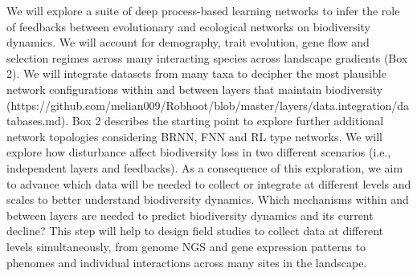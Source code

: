 \documentclass[12pt]{article}
\begin{document}
\begin{center}
\begin{mybox}
\begin{singlespace}
\begin{small}
  We will explore a suite of deep process-based learning networks to infer the role of feedbacks between evolutionary and ecological networks on biodiversity dynamics. We will account for demography, trait evolution, gene flow and selection regimes across many interacting species across landscape gradients (Box 2). We will integrate datasets from many taxa to decipher the most plausible network configurations within and between layers that maintain biodiversity (https://github.com/melian009/Robhoot/blob/master/layers/data.integration/databases.md). Box 2 describes the starting point to explore further additional network topologies considering BRNN, FNN and RL type networks. We will explore how disturbance affect biodiversity loss in two different scenarios (i.e., independent layers and feedbacks). As a consequence of this exploration, we aim to advance which data will be needed to collect or integrate at different levels and scales to better understand biodiversity dynamics. Which mechanisms within and between layers are needed to predict biodiversity dynamics and its current decline? This step will help to design field studies to collect data at different levels simultaneously, from genome NGS and gene expression patterns to phenomes and individual interactions across many sites in the landscape. 
\end{small}
\end{singlespace}
\end{mybox}

\end{center}
\end{document}
